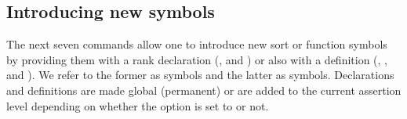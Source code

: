 \subsection{Introducing new symbols} \label{sec:new-symbols}

The next seven commands allow one to introduce new sort or function symbols
by providing them with a rank declaration 
(,  and )
or also with a definition 
(, ,  and 
).
We refer to the former as  symbols and 
the latter as  symbols.
Declarations and definitions are made global (permanent) or are added 
to the current assertion level depending on 
whether the  option is set to  or not.

